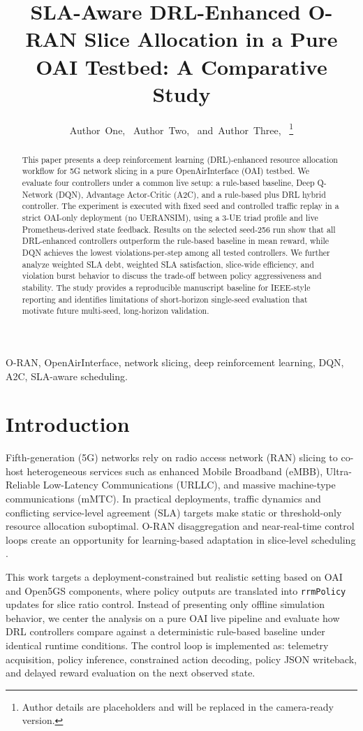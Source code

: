 \documentclass[journal]{IEEEtran}
\title{SLA-Aware DRL-Enhanced O-RAN Slice Allocation in a Pure OAI Testbed: A Comparative Study}
\author{Author~One,~\IEEEmembership{Member,~IEEE,}
        Author~Two,~\IEEEmembership{Member,~IEEE,}
        and~Author~Three,~\IEEEmembership{Senior~Member,~IEEE}%
\thanks{Author details are placeholders and will be replaced in the camera-ready version.}%
}
\begin{document}
\maketitle

\begin{abstract}
This paper presents a deep reinforcement learning (DRL)-enhanced resource allocation workflow for 5G network slicing in a pure OpenAirInterface (OAI) testbed. We evaluate four controllers under a common live setup: a rule-based baseline, Deep Q-Network (DQN), Advantage Actor-Critic (A2C), and a rule-based plus DRL hybrid controller. The experiment is executed with fixed seed and controlled traffic replay in a strict OAI-only deployment (no UERANSIM), using a 3-UE triad profile and live Prometheus-derived state feedback. Results on the selected seed-256 run show that all DRL-enhanced controllers outperform the rule-based baseline in mean reward, while DQN achieves the lowest violations-per-step among all tested controllers. We further analyze weighted SLA debt, weighted SLA satisfaction, slice-wide efficiency, and violation burst behavior to discuss the trade-off between policy aggressiveness and stability. The study provides a reproducible manuscript baseline for IEEE-style reporting and identifies limitations of short-horizon single-seed evaluation that motivate future multi-seed, long-horizon validation.
\end{abstract}

\begin{IEEEkeywords}
O-RAN, OpenAirInterface, network slicing, deep reinforcement learning, DQN, A2C, SLA-aware scheduling.
\end{IEEEkeywords}

\section{Introduction}
Fifth-generation (5G) networks rely on radio access network (RAN) slicing to co-host heterogeneous services such as enhanced Mobile Broadband (eMBB), Ultra-Reliable Low-Latency Communications (URLLC), and massive machine-type communications (mMTC). In practical deployments, traffic dynamics and conflicting service-level agreement (SLA) targets make static or threshold-only resource allocation suboptimal. O-RAN disaggregation and near-real-time control loops create an opportunity for learning-based adaptation in slice-level scheduling \cite{ref_oran_alliance,ref_oran_arch}.

This work targets a deployment-constrained but realistic setting based on OAI and Open5GS components, where policy outputs are translated into \texttt{rrmPolicy} updates for slice ratio control. Instead of presenting only offline simulation behavior, we center the analysis on a pure OAI live pipeline and evaluate how DRL controllers compare against a deterministic rule-based baseline under identical runtime conditions. The control loop is implemented as: telemetry acquisition, policy inference, constrained action decoding, policy JSON writeback, and delayed reward evaluation on the next observed state.
\end{document}
